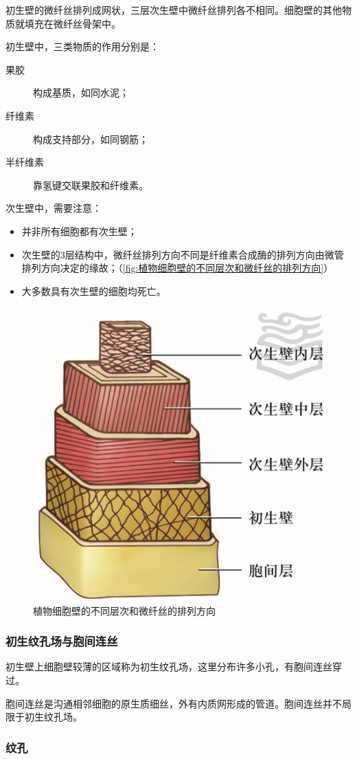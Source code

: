 初生壁的微纤丝排列成网状，三层次生壁中微纤丝排列各不相同。细胞壁的其他物质就填充在微纤丝骨架中。

初生壁中，三类物质的作用分别是：
\begin{description}
	\item[果胶] 构成基质，如同水泥；
	\item[纤维素] 构成支持部分，如同钢筋；
	\item[半纤维素] 靠氢键交联果胶和纤维素。
\end{description}

次生壁中，需要注意：
\begin{itemize}
	\item 并非所有细胞都有次生壁；
	\item 次生壁的3层结构中，微纤丝排列方向不同是纤维素合成酶的排列方向由微管排列方向决定的缘故；（\autoref{fig:植物细胞壁的不同层次和微纤丝的排列方向}）
	\item 大多数具有次生壁的细胞均死亡。
\end{itemize}

\begin{figure}[htbp]
	\centering
	\includegraphics[width=0.4\linewidth]{Pics/次生壁的3层}
	\caption{植物细胞壁的不同层次和微纤丝的排列方向}
	\label{fig:植物细胞壁的不同层次和微纤丝的排列方向}
\end{figure}

\subsubsection{初生纹孔场与胞间连丝}

初生壁上细胞壁较薄的区域称为初生纹孔场，这里分布许多小孔，有胞间连丝穿过。

胞间连丝是沟通相邻细胞的原生质细丝，外有内质网形成的管道。胞间连丝并不局限于初生纹孔场。

\subsubsection{纹孔}

